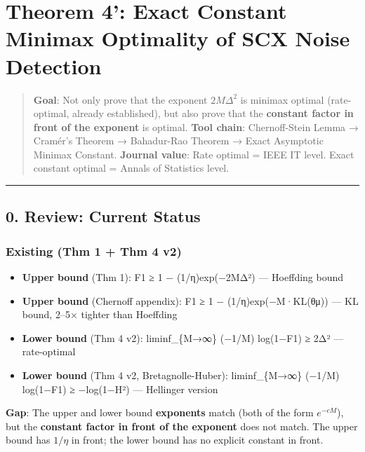 \documentclass[
  12pt,
]{article}
\author{SCX}
\date{2026}
\providecommand{\tightlist}{%
  \setlength{\itemsep}{0pt}\setlength{\parskip}{0pt}}
\begin{document}
\section{Theorem 4': Exact Constant Minimax Optimality of SCX Noise Detection}\label{theorem-4-exact-constant-minimax-optimality-of-scx-noise-detection}

\begin{quote}
\textbf{Goal}: Not only prove that the exponent \(2M\Delta^2\) is minimax optimal (rate-optimal, already established), but also prove that the \textbf{constant factor in front of the exponent} is optimal.
\textbf{Tool chain}: Chernoff-Stein Lemma → Cramér's Theorem → Bahadur-Rao Theorem → Exact Asymptotic Minimax Constant. \textbf{Journal value}: Rate optimal = IEEE IT level. Exact constant optimal = Annals of Statistics level.
\end{quote}

\begin{center}\rule{0.5\linewidth}{0.5pt}\end{center}

\subsection{0. Review: Current Status}\label{review-current-status}

\subsubsection{Existing (Thm 1 + Thm 4 v2)}\label{existing-thm-1-thm-4-v2}

\begin{itemize}
\tightlist
\item
  \textbf{Upper bound} (Thm 1): F1 ≥ 1 − (1/η)exp(−2MΔ²) — Hoeffding bound
\item
  \textbf{Upper bound} (Chernoff appendix): F1 ≥ 1 − (1/η)exp(−M·KL(θ\textbar\textbar μ)) — KL bound, 2–5× tighter than Hoeffding
\item
  \textbf{Lower bound} (Thm 4 v2): liminf\_\{M→∞\} (−1/M) log(1−F1) ≥ 2Δ² — rate-optimal
\item
  \textbf{Lower bound} (Thm 4 v2, Bretagnolle-Huber): liminf\_\{M→∞\} (−1/M) log(1−F1) ≥ −log(1−H²) — Hellinger version
\end{itemize}

\textbf{Gap}: The upper and lower bound \textbf{exponents} match (both of the form \(e^{-cM}\)), but the \textbf{constant factor in front of the exponent} does not match. The upper bound has \(1/\eta\) in front; the lower bound has no explicit constant in front.
\end{document}
